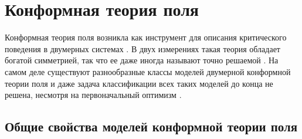 

\chapter{Конформная теория поля}
\label{cha:CFT}

Конформная теория поля возникла как инструмент для описания критического поведения в двумерных системах \cite{Polyakov:1970xd}. В двух измерениях такая теория обладает богатой симметрией, так что ее даже иногда называют точно решаемой \cite{belavin1984ics}. На самом деле существуют разнообразные классы моделей двумерной конформной теории поля и даже задача классификации всех таких моделей до конца не решена, несмотря на первоначальный оптимизм \cite{}.

\section{Общие свойства моделей конформной теории поля}
\label{sec:conformal-field-theory-general}


